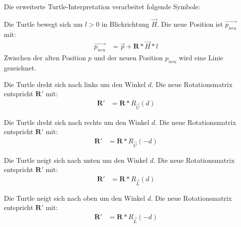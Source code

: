Die erweiterte Turtle-Interpretation verarbeitet folgende Symbole:

\begin{description}[labelindent]
	\item[\boldmath$F(l)$]  Die Turtle bewegt sich um $l>0$ in Blickrichtung $\overrightarrow{H}$. Die neue Position ist $\overrightarrow{p_{neu}}$ mit:
	\begin{equation}
	\begin{array}{ll}
	\overrightarrow{p_{neu}} & = \overrightarrow{p} + \boldsymbol{R} * \overrightarrow{H} * l
	\end{array}
	\label{eq:Turtle3D_F}
	\end{equation} 
	Zwischen der alten Position $p$ und der neuen Position $p_{neu}$ wird eine Linie gezeichnet. \\
	
	\item[\boldmath$+(d)$]  Die Turtle dreht sich nach links um den Winkel $d$. Die neue Rotationsmatrix entspricht $\boldsymbol{R'}$ mit:\\
	\begin{equation}
	\begin{array}{ll}
	\boldsymbol{R'} & =  \boldsymbol{R} * R_{\overrightarrow{U}}(d)
	\end{array}
	\end{equation} 
	
	\item[\boldmath$-(d)$]  Die Turtle dreht sich nach rechts um den Winkel $d$. Die neue Rotationsmatrix entspricht $\boldsymbol{R'}$ mit:\\
	\begin{equation}
	\begin{array}{ll}
	\boldsymbol{R'} & =  \boldsymbol{R} * R_{\overrightarrow{U}}(-d)
	\end{array}
	\end{equation} 
	
	\item[\boldmath$\&(d)$]  Die Turtle neigt sich nach unten um den Winkel $d$. Die neue Rotationsmatrix entspricht $\boldsymbol{R'}$ mit:\\
	\begin{equation}
	\begin{array}{ll}
	\boldsymbol{R'} & =  \boldsymbol{R} * R_{\overrightarrow{L}}(d)
	\end{array}
	\end{equation}
	
	\item[\boldmath$^\wedge (d)$]  Die Turtle neigt sich nach oben um den Winkel $d$. Die neue Rotationsmatrix entspricht $\boldsymbol{R'}$ mit:\\
	\begin{equation}
	\begin{array}{ll}
	\boldsymbol{R'} & =  \boldsymbol{R} * R_{\overrightarrow{L}}(-d)
	\end{array}
	\end{equation}
	

\end{description}
